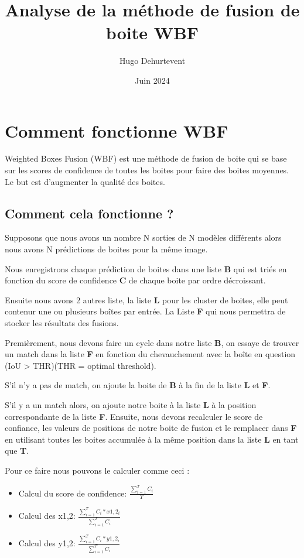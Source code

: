 \documentclass{article}
\begin{document}
\title{Analyse de la méthode de fusion de boite WBF}
\date{Juin 2024}
\author{Hugo Dehurtevent}
\maketitle
\section{Comment fonctionne WBF}
Weighted Boxes Fusion (WBF) est une méthode de fusion de boite qui se base sur les scores de confidence de toutes les boites pour faire des boites moyennes. Le but est d'augmenter la qualité des boites.
\subsection{Comment cela fonctionne ?}
Supposons que nous avons un nombre N sorties de N modèles différents alors nous avons N prédictions de boites pour la même image.

Nous enregistrons chaque prédiction de boites dans une liste \textbf{B} qui est triés en fonction du score de confidence \textbf{C} de chaque boite par ordre décroissant.

Ensuite nous avons 2 autres liste, la liste \textbf{L} pour les cluster de boites, elle peut contenur une ou plusieurs boîtes par entrée. La Liste \textbf{F} qui nous permettra de stocker les résultats des fusions. 

Premièrement, nous devons faire un cycle dans notre liste \textbf{B}, on essaye de trouver un match dans la liste \textbf{F} en fonction du chevauchement avec la boîte en question (IoU > THR)(THR = optimal threshold).

S'il n'y a pas de match, on ajoute la boite de \textbf{B} à la fin de la liste \textbf{L} et \textbf{F}.

S'il y a un match alors, on ajoute notre boite à la liste \textbf{L} à la position correspondante de la liste \textbf{F}. Ensuite, nous devons recalculer le score de confiance, les valeurs de positions de notre boite de fusion et le remplacer dans \textbf{F} en utilisant toutes les boites accumulée à la même position dans la liste \textbf{L} en tant que \textbf{T}.

Pour ce faire nous pouvons le calculer comme ceci : 

\begin{itemize}
    \item Calcul du score de confidence: \(\frac{\sum_{i=1}^{T}C_i}{T}\)
    \item Calcul des x1,2: \(\frac{\sum_{i=1}^{T}C_i*x1,2_{i}}{\sum_{i=1}^{T}C_i}\)
    \item Calcul des y1,2: \(\frac{\sum_{i=1}^{T}C_i*y1,2_{i}}{\sum_{i=1}^{T}C_i}\)
\end{itemize}
\end{document}

